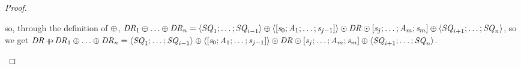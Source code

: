 \documentclass[numbers,10pt,preprint\ifanon ,nocopyrightspace\fi]{sigplanconf}
\begin{document}
\begin{proof}
\begin{case}[\DNFStructuralRewriteRule{}]
    so, through the definition of $\oplus$,
    $\mathit{DR}_1 \oplus \ldots \oplus \mathit{DR}_n =
    \langle\mathit{SQ}_1;\ldots;\mathit{SQ}_{i-1}\rangle \oplus
    \langle[\mathit{s}_0;\mathit{A}_1;\ldots;\mathit{s}_{j-1}]\rangle\odot\mathit{DR}\odot[\mathit{s}_j;\ldots;\mathit{A}_m;\mathit{s}_m] \oplus
    \langle\mathit{SQ}_{i+1};\ldots;\mathit{SQ}_n\rangle$,
    so we get $\DNFRegex \ParallelRewrite \DNFRegex_1 \OrDNF \ldots \OrDNF \DNFRegex_n =
    \DNFOf{\Sequence_1\DNFSep\ldots\DNFSep\Sequence_{i-1}} \OrDNF
    \DNFOf{\SequenceOf{\String_0\SequenceSep\Atom_1\SequenceSep\ldots\SequenceSep\String_{j-1}}}\ConcatDNF\DNFRegex\ConcatDNF\SequenceOf{\String_j\SequenceSep\ldots\SequenceSep\Atom_m\SequenceSep\String_m} \OrDNF
    \DNFOf{\Sequence_{i+1}\DNFSep\ldots\DNFSep\Sequence_n}$.
  \end{case}
\end{proof}
\end{document}
